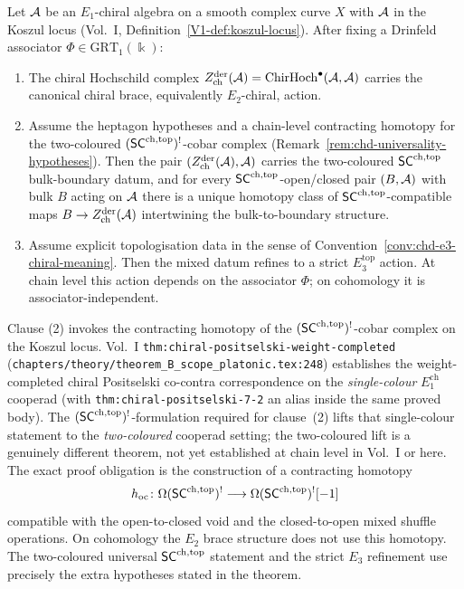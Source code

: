 \begin{theorem}%
\label{thm:chiral-higher-deligne}%
%
%
Let $\mathcal{A}$ be an $E_1$-chiral algebra on a smooth complex curve $X$ with
$\mathcal{A}$ in the Koszul locus (Vol.~I, Definition~\ref*{V1-def:koszul-locus}).
After fixing a Drinfeld associator $\Phi \in \mathrm{GRT}_1(\Bbbk)$:
\begin{enumerate}
\item The chiral Hochschild complex
$Z^{\mathrm{der}}_{\mathrm{ch}}(\mathcal{A}) = \mathrm{ChirHoch}^\bullet(\mathcal{A},\mathcal{A})$
carries the canonical chiral brace, equivalently $E_2$-chiral,
action.
\item Assume the heptagon hypotheses and a chain-level contracting
homotopy for the two-coloured $(\mathsf{SC}^{\mathrm{ch},\mathrm{top}})^!$-cobar complex
(Remark~\ref{rem:chd-universality-hypotheses}). Then the pair
\((Z^{\mathrm{der}}_{\mathrm{ch}}(\mathcal{A}),\mathcal{A})\) carries the
two-coloured $\mathsf{SC}^{\mathrm{ch},\mathrm{top}}$ bulk-boundary datum, and for every
$\mathsf{SC}^{\mathrm{ch},\mathrm{top}}$-open/closed pair $(B,\mathcal{A})$ with bulk $B$ acting on
$\mathcal{A}$ there is a unique homotopy class of $\mathsf{SC}^{\mathrm{ch},\mathrm{top}}$-compatible maps
$B\to Z^{\mathrm{der}}_{\mathrm{ch}}(\mathcal{A})$ intertwining the
bulk-to-boundary structure.
\item Assume explicit topologisation data in the sense of
Convention~\ref{conv:chd-e3-chiral-meaning}. Then the mixed datum
refines to a strict $E_3^{\mathrm{top}}$ action. At chain level this
action depends on the associator $\Phi$; on cohomology it is
associator-independent.
\end{enumerate}
\end{theorem}

\begin{remark}%
\label{rem:chd-universality-hypotheses}%
%
Clause (2) invokes the contracting homotopy of the $(\mathsf{SC}^{\mathrm{ch},\mathrm{top}})^!$-cobar
complex on the Koszul locus. Vol.~I
\texttt{thm:chiral-positselski-weight-completed}
(\texttt{chapters/theory/theorem\_B\_scope\_platonic.tex:248}) establishes
the weight-completed chiral Positselski co-contra correspondence on the
\emph{single-colour} $E_1^{\mathrm{ch}}$ cooperad (with
\texttt{thm:chiral-positselski-7-2} an alias inside the same proved body).
The
$(\mathsf{SC}^{\mathrm{ch},\mathrm{top}})^!$-formulation required for clause~(2) lifts that
single-colour statement to the \emph{two-coloured} cooperad setting;
the two-coloured lift is a genuinely different theorem, not yet
established at chain level in Vol.~I or here. The exact proof
obligation is the construction of a contracting homotopy
\[
 h_{\mathrm{oc}}\colon
 \Omega(\mathsf{SC}^{\mathrm{ch},\mathrm{top}})^! \longrightarrow \Omega(\mathsf{SC}^{\mathrm{ch},\mathrm{top}})^![-1]
\]
compatible with the open-to-closed void and the closed-to-open mixed
shuffle operations. On cohomology the $E_2$ brace structure does not
use this homotopy. The two-coloured universal $\mathsf{SC}^{\mathrm{ch},\mathrm{top}}$ statement and
the strict $E_3$ refinement use precisely the extra hypotheses stated
in the theorem.
\end{remark}

